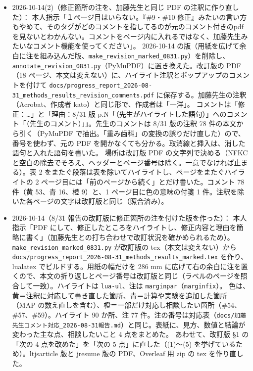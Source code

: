\documentclass[11pt,a4paper]{jsarticle}
\begin{document}
\begin{itemize}[nosep]
  \item 2026-10-14(2)（修正箇所の注を、加藤先生と同じ PDF の注釈に作り直した）：
    本人指示「１ページ目はいらない。『\#9・\#10 修正』みたいの言い方もやめて、そのタグがどのコメントを指してるのが元のコメント付きのpdfを見ないとわかんない。コメントをページ内に入れるではなく、加藤先生みたいなコメント機能を使ってください」。
    2026-10-14 の版（用紙を広げて余白に注を組み込んだ版、\texttt{make\_revision\_marked\_0831.py}）を削除し、\texttt{annotate\_revision\_0831.py}（PyMuPDF）に置き換えた。改訂版の PDF（18 ページ、本文は変えない）に、ハイライト注釈とポップアップのコメントを付けて \texttt{docs/progress\_report\_2026-08-31\_methods\_results\_revision\_comments.pdf} に保存する。加藤先生の注釈（Acrobat、作成者 kato）と同じ形で、作成者は「一洋」。
    コメントは「修正：…」と「理由：8/31 版 p.N「（先生がハイライトした語句）」へのコメント「（先生のコメント）」」。先生のコメントは 8/31 版の注釈 78 件の本文から引く（PyMuPDF で抽出。「重み歯科」の変換の誤りだけ直した）ので、番号を使わず、元の PDF を開かなくても分かる。取消線と挿入は、消した語句と入れた語句を書いた。
    場所は改訂版 PDF の文字列で決める（NFKC と空白の除去でそろえ、ヘッダーとページ番号は除く。一意でなければ止まる）。表 2 をまたぐ段落は表を除いてハイライトし、ページをまたぐハイライトの 2 ページ目には「前のページから続く」とだけ書いた。コメント 78 件（黄 53、青 16、橙 9）と、1 ページ目に色の意味の付箋 1 件。注釈を除いた各ページの文字は改訂版と同じ（照合済み）。
  \item 2026-10-14（8/31 報告の改訂版に修正箇所の注を付けた版を作った）：
    本人指示「PDF にして、修正したところをハイライトし、修正内容と理由を簡略に書く」（加藤先生との打ち合わせで改訂状況を確かめられるため）。
    \texttt{make\_revision\_marked\_0831.py} が改訂版の tex（本文は変えない）から \texttt{docs/progress\_report\_2026-08-31\_methods\_results\_marked.tex} を作り、lualatex でビルドする。用紙の幅だけを 286 mm に広げて右の余白に注を置くので、本文の折り返しとページ番号は改訂版と同じ（ラベルのページを照合して一致）。ハイライトは \texttt{lua-ul}、注は \texttt{marginpar}（\texttt{marginfix}）。
    色は、黄＝注釈に対応して書き直した箇所、青＝計算や実験を追加した箇所（MAP の数え直しを含む）、橙＝一部だけ対応し相談したい箇所（\#54、\#57、\#59）。ハイライト 90 か所、注 77 件。注の番号は対応表（\texttt{docs/加藤先生コメント対応\_2026-08-31報告.md}）と同じ。表紙に、見方、数値と結論が変わった主な点、相談したいこと 4 点をまとめた。
    あわせて、改訂版 \S 1 の「次の 4 点を改めた」を「次の 5 点」に直した（(1)〜(5) を挙げているため）。ltjsarticle 版と jresume 版の PDF、Overleaf 用 zip の tex を作り直した。

\end{itemize}
\end{document}
